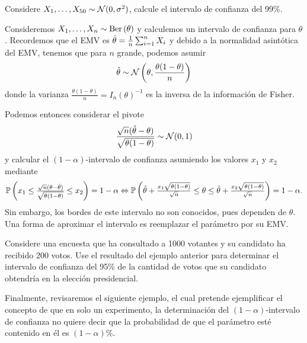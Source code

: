 \begin{exercise}
Considere $X_1,\ldots,X_{50}\sim{\mathcal N}(0,\sigma^2)$, calcule el intervalo de confianza del 99\%.
\end{exercise}

\begin{example} Consideremos $X_1,\ldots,X_{n}\sim\text{Ber}\left(\theta\right)$ y calculemos un intervalo de confianza para $\theta$. Recordemos que el EMV es ${\hat\theta} = \frac{1}{n}\sum_{i=1}^nX_i$ y debido a la normalidad asintótica del EMV, tenemos que para $n$ grande, podemos asumir 
\begin{equation}
	{\hat\theta}\sim{\mathcal N}\left(\theta,\frac{\theta(1-\theta)}{n}\right)
\end{equation}
donde la varianza $\frac{\theta(1-\theta)}{n}=I_n(\theta)^{-1}$ es la inversa de la información de Fisher. 

Podemos entonces considerar el pivote
\begin{equation}
	\frac{\sqrt{n}({\hat\theta}-\theta)}{\sqrt{\theta(1-\theta)}}\sim{\mathcal N}(0,1)
\end{equation}
y calcular el $(1-\alpha)$-intervalo de confianza asumiendo los valores $x_1$ y $x_2$ mediante 
\begin{align*}
	\mathbb{P} \left(x_1 \leq \tfrac{\sqrt{n}(\theta-{\hat\theta})}{\sqrt{\theta(1-\theta)}} \leq x_2\right) = 1-\alpha \Leftrightarrow \mathbb{P} \left({\hat\theta} + \tfrac{x_1\sqrt{\theta(1-\theta)}}{\sqrt{n}} \leq \theta \leq {\hat\theta} + \tfrac{x_2\sqrt{\theta(1-\theta)}}{\sqrt{n}}\right) = 1-\alpha.
\end{align*}
Sin embargo, los bordes de este intervalo no son conocidos, pues dependen de $\theta$. Una forma de aproximar el intervalo es reemplazar el parámetro por su EMV. 
\end{example}


\begin{exercise} Considere una encuesta que ha consultado a 1000 votantes y su candidato ha recibido 200 votos. Use el resultado del ejemplo anterior para determinar el intervalo de confianza del 95\% de la cantidad de votos que su candidato obtendría en la elección presidencial. 
\end{exercise}

Finalmente, revisaremos el siguiente ejemplo, el cual pretende ejemplificar el concepto de que en solo un experimento, la determinación del $(1-\alpha)$-intervalo de confianza no quiere decir que la probabilidad de que el parámetro esté contenido en él es $(1-\alpha)$\%. 


